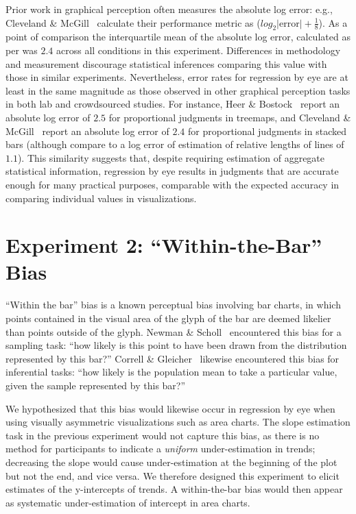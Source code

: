 \documentclass{sigchi}
\begin{document}
Prior work in graphical perception often measures the absolute log error: e.g., Cleveland \& McGill~\cite{cleveland1984graphical} calculate their performance metric as ($log_2 |\text{error}| + \frac{1}{8}$). As a point of comparison the interquartile mean of the absolute log error, calculated as per  was $2.4$ across all conditions in this experiment. Differences in methodology and measurement discourage statistical inferences comparing this value with those in similar experiments. Nevertheless, error rates for regression by eye are at least in the same magnitude as those observed in other graphical perception tasks in both lab and crowdsourced studies. For instance, Heer \& Bostock~\cite{heer2010crowdsourcing} report an absolute log error of $2.5$ for proportional judgments in treemaps, and Cleveland \& McGill~\cite{cleveland1984graphical} report an absolute log error of $2.4$ for proportional judgments in stacked bars (although compare to a log error of estimation of relative lengths of lines of $1.1$). This similarity suggests that, despite requiring estimation of aggregate statistical information, regression by eye results in judgments that are accurate enough for many practical purposes, comparable with the expected accuracy in comparing individual values in visualizations. 

\section{Experiment 2: ``Within-the-Bar'' Bias}

\expTwoTypesFig

``Within the bar'' bias is a known perceptual bias involving bar charts, in which points contained in the visual area of the glyph of the bar are deemed likelier than points outside of the glyph. Newman \& Scholl~\cite{newman2012bar} encountered this bias for a sampling task: ``how likely is this point to have been drawn from the distribution represented by this bar?'' Correll \& Gleicher~\cite{correll2014error} likewise encountered this bias for inferential tasks: ``how likely is the population mean to take a particular value, given the sample represented by this bar?''

We hypothesized that this bias would likewise occur in regression by eye when using visually asymmetric visualizations such as area charts. The slope estimation task in the previous experiment would not capture this bias, as there is no method for participants to indicate a \emph{uniform} under-estimation in trends; decreasing the slope would cause under-estimation at the beginning of the plot but not the end, and vice versa. We therefore designed this experiment to elicit estimates of the y-intercepts of trends. A within-the-bar bias would then appear as systematic under-estimation of intercept in area charts.
\end{document}
